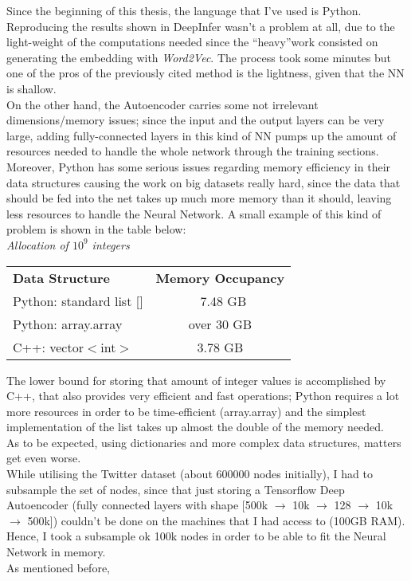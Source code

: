 \documentclass{article}
\begin{document}
			Since the beginning of this thesis, the language that I've used is Python. Reproducing the results shown in DeepInfer wasn't a problem at all, due to the light-weight of the computations needed since the \textquotedblleft heavy\textquotedblright work consisted on generating the embedding with \textit{Word2Vec}. The process took some minutes but one of the pros of the previously cited method is the lightness, given that the NN is shallow.\\
			On the other hand, the Autoencoder carries some not irrelevant dimensions/memory issues; since the input and the output layers can be very large, adding fully-connected layers in this kind of NN pumps up the amount of resources needed to handle the whole network through the training sections.\\
			Moreover, Python has some serious issues regarding memory efficiency in their data structures causing the work on big datasets really hard, since the data that should be fed into the net takes up much more memory than it should, leaving less resources to handle the Neural Network. A small example of this kind of problem is shown in the table below:\bigskip \\
			\textit{Allocation of $10^{9}$ integers}\\
			\vspace{0.8cm}
			\begin{centering}
				\begin{tabular}{l | c}
					\textbf{Data Structure} & \textbf{Memory Occupancy}\\
					Python: standard list [] & ~7.48 GB \\
					Python: array.array & over 30 GB\\
					C++: vector$<$int$>$ & 3.78 GB
				\end{tabular}
			\end{centering}
			\newline
			The lower bound for storing that amount of integer values is accomplished by C++, that also provides very efficient and fast operations; Python requires a lot more resources in order to be time-efficient (array.array) and the simplest implementation of the list takes up almost the double of the memory needed.\\
			As to be expected, using dictionaries and more complex data structures, matters get even worse.\smallskip\\
			While utilising the Twitter dataset (about 600000 nodes initially), I had to subsample the set of nodes, since that just storing a Tensorflow Deep Autoencoder (fully connected layers with shape [500k $\rightarrow$ 10k $\rightarrow$ 128 $\rightarrow$ 10k $\rightarrow$ 500k]) couldn't be done on the machines that I had access to (100GB RAM). Hence, I took a subsample ok 100k nodes in order to be able to fit the Neural Network in memory.\\
			As mentioned before,
			
\end{document}

